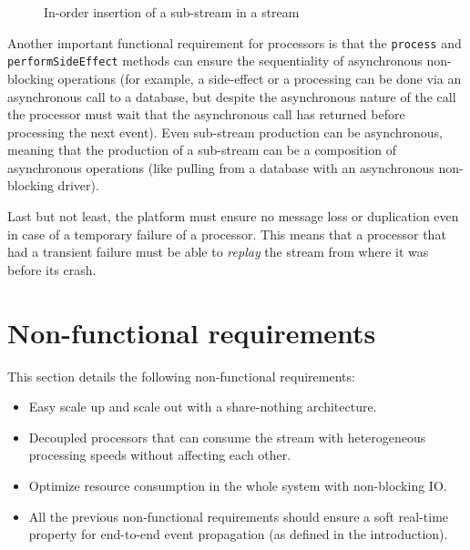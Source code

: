 \begin{figure}[h]
  \begin{center} 
    \caption{In-order insertion of a sub-stream in a stream}
    \label{fig:substream}
  \end{center}
\end{figure}

Another important functional requirement for processors is that the \verb|process| and \verb|performSideEffect| methods can ensure the
sequentiality of asynchronous non-blocking operations (for example, a side-effect or a processing can be done via an asynchronous call to a 
database, but despite the asynchronous nature of the call the processor must wait that the asynchronous call has returned
before processing the next event). Even sub-stream production can be asynchronous, meaning that the production of a sub-stream
can be a composition of asynchronous operations (like pulling from a database with an asynchronous non-blocking driver).

Last but not least, the platform must ensure no message loss or duplication even in case of a temporary failure of a processor. This means that a processor
that had a transient failure must be able to \textit{replay} the stream from where it was before its crash.

\section{Non-functional requirements}

This section details the following non-functional requirements:
\begin{itemize}
  \item Easy scale up and scale out with a share-nothing architecture.
  \item Decoupled processors that can consume the stream with heterogeneous processing speeds without affecting each other.
  \item Optimize resource consumption in the whole system with non-blocking IO.
  \item All the previous non-functional requirements should ensure a soft real-time property for end-to-end event propagation (as defined in the introduction).
\end{itemize}

